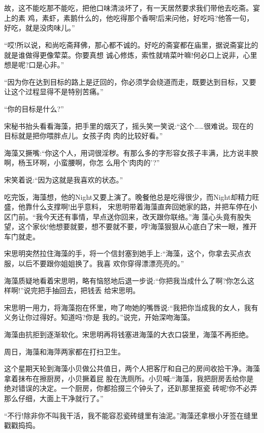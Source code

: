 \documentclass[11pt,a4paper,onecolumn]{article}
\begin{document}
\section[\thesection]{}故，这不能吃那不能吃，把他口味清淡坏了，有一天居然要求我们带他去吃斋。宴上的素
鸡，素虾，素鹅什么的，他吃得那个香啊!后来问他，好吃吗?他答一句，好吃，就是没肉味儿。''

``哎!所以说，和尚吃斋拜佛，那心都不诚的。好吃的斋宴都在庙里，据说斋宴比的就是谁做得更像荤菜。你要真想
诚心修炼，索性就啃菜叶嘛!何必口上说非，心里想是呢?口是心非。''

``因为你在达到目标的路上是迂回的，你必须学会绕道而走，既要达到目标，又要让这个过程显得不是特别苦痛。''

``你的目标是什么?''

宋秘书抬头看看海藻，把手里的烟灭了，摇头笑一笑说:``这个……很难说。现在的目标就是把你喂胖点儿。女孩子肉
肉的比较好看。''

海藻又撅嘴:``你这个人，用词很淫秽。有那么多的字形容女孩子丰满，比方说丰腴啊，杨玉环啊，小蛮腰啊，你怎
么用个'肉肉的'?''

宋笑着说:``因为这就是我喜欢的状态。''

吃完饭，海藻想，他的Night又要上演了。晚餐他总是吃得很少，而Night却精力旺盛，他靠什么支撑啊!出乎意料，
宋思明带着海藻直奔回她家的路，并把车停在小区门前。``我今天还有事情，早点送你回来，改天跟你联络。''海
藻心头竟有股失望，这个家伙!他想要就要，想不要就不要，哼!海藻狠狠从心底白了宋一眼，推开车门就走。

宋思明突然拉住海藻的手，将一个信封塞到她手上:``海藻，这个，你拿去买点衣服，以后不要跟你姐姐换了。我喜
欢你穿得漂漂亮亮的。''

海藻质疑地看着宋思明，略有恼怒地后退一步说:``你把我当成什么了啊?你怎么这样啊!''说完把手抽回去，把钱丢
给宋思明。

宋思明一用力，将海藻抱在怀里，吻了吻她的嘴唇说:``我把你当成我的女人，我有义务让你过得好。知道吗?你是
我的。''说完，开始深吻海藻。

海藻由抗拒到逐渐软化。宋思明再将钱塞进海藻的大衣口袋里，海藻不再拒绝。

周日，海藻和海萍两家都在打扫卫生。

这个星期天轮到海藻小贝做公共值日，两个人把客厅和自己的房间收拾干净。海藻拿着抹布在擦厨房，小贝撅着屁
股在洗厕所。小贝喊:``海藻，我把厨房丢给你是绝对错误的决定。一个厨房，你都拾掇三个钟头了，还趴那里抠瓷
砖呢!你不必弄那么仔细，大面上干净就行了。''

``不行!除非你不叫我干活，我不能容忍瓷砖缝里有油泥。''海藻还拿根小牙签在缝里戳戳捣捣。
\end{document}
